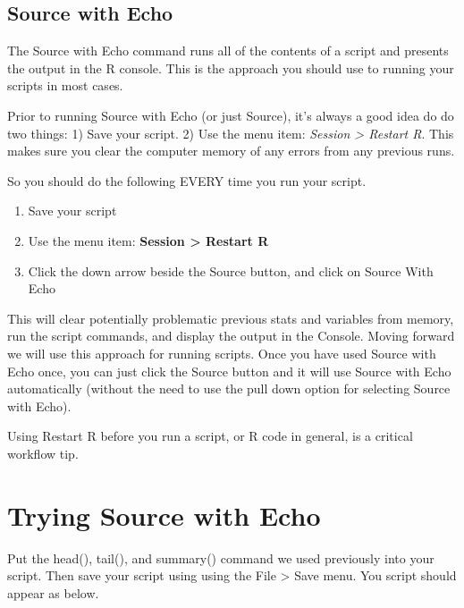 \documentclass[
]{krantz}
\makeatletter
\providecommand{\tightlist}{%
  \setlength{\itemsep}{0pt}\setlength{\parskip}{0pt}}
\newenvironment{kframe}{%
\medskip{}
\setlength{\fboxsep}{.8em}
 \def\at@end@of@kframe{}%
 \ifinner\ifhmode%
  \def\at@end@of@kframe{\end{minipage}}%
  \begin{minipage}{\columnwidth}%
 \fi\fi%
 \def\FrameCommand##1{\hskip\@totalleftmargin \hskip-\fboxsep
 \colorbox{shadecolor}{##1}\hskip-\fboxsep
     \hskip-\linewidth \hskip-\@totalleftmargin \hskip\columnwidth}%
 \MakeFramed {\advance\hsize-\width
   \@totalleftmargin\z@ \linewidth\hsize
   \@setminipage}}%
 {\par\unskip\endMakeFramed%
 \at@end@of@kframe}
\newenvironment{rmdblock}[1]
  {
  \begin{itemize}
  \renewcommand{\labelitemi}{
    \raisebox{-.7\height}[0pt][0pt]{
      {\setkeys{Gin}{width=3em,keepaspectratio}\texttt{[image: images/\#1]}}
    }
  }
  \setlength{\fboxsep}{1em}
  \begin{kframe}
  \item
  }
  {
  \end{kframe}
  \end{itemize}
  }
\newenvironment{rmdcaution}
  {\begin{rmdblock}{caution}}
  {\end{rmdblock}}
\makeatother
\begin{document}
\hypertarget{source-with-echo}{%
\subsection{Source with Echo}\label{source-with-echo}}

The Source with Echo command runs all of the contents of a script and presents the output in the R console. This is the approach you should use to running your scripts in most cases.

Prior to running Source with Echo (or just Source), it's always a good idea do do two things: 1) Save your script. 2) Use the menu item: \emph{Session \textgreater{} Restart R}. This makes sure you clear the computer memory of any errors from any previous runs.

So you should do the following EVERY time you run your script.

\begin{enumerate}
\def\labelenumi{\arabic{enumi}.}
\tightlist
\item
  Save your script
\item
  Use the menu item: \textbf{Session \textgreater{} Restart R}
\item
  Click the down arrow beside the Source button, and click on Source With Echo
\end{enumerate}

This will clear potentially problematic previous stats and variables from memory, run the script commands, and display the output in the Console. Moving forward we will use this approach for running scripts. Once you have used Source with Echo once, you can just click the Source button and it will use Source with Echo automatically (without the need to use the pull down option for selecting Source with Echo).

\begin{rmdcaution}
Using Restart R before you run a script, or R code in general, is a critical workflow tip.
\end{rmdcaution}

\hypertarget{trying-source-with-echo}{%
\section{Trying Source with Echo}\label{trying-source-with-echo}}

Put the head(), tail(), and summary() command we used previously into your script. Then save your script using using the File \textgreater{} Save menu. You script should appear as below.
\end{document}
